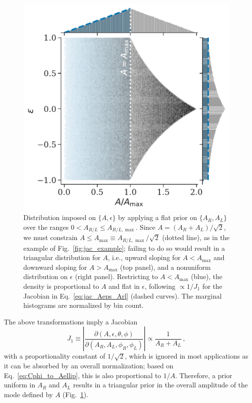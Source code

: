 \documentclass[aps,prd,twocolumn,superscriptaddress,preprintnumbers,floatfix,nofootinbib]{revtex4-2}
\newcommand*{\eq}[1]{Eq.~\eqref{eq:#1}}
\begin{document}
\begin{figure}
\includegraphics[width=0.8\columnwidth]{jac_Aeps_Arl}
\caption{Distribution imposed on $\{A,\epsilon\}$ by applying a flat prior on $\{A_R,A_L\}$ over the ranges $0 < A_{R/L} \leq A_{R/L,\max}$.
Since $A = (A_R + A_L)/\sqrt{2}$, we must constrain $A \leq A_{\max} \equiv A_{R/L,\max}/\sqrt{2}$ (dotted line), as in the example of Fig.~\ref{fig:jac_example};
failing to do so would result in a triangular distribution for $A$, i.e., upward sloping for $A < A_{\max}$ and downward sloping for $A > A_{\max}$ (top panel), and a nonuniform distribution on $\epsilon$ (right panel).
Restricting to $A < A_{\max}$ (blue), the density is proportional to $A$ and flat in $\epsilon$, following $\propto 1/J_1$ for the Jacobian in \eq{jac_Aeps_Arl} (dashed curves).
The marginal histograms are normalized by bin count.
}
\label{fig:jac_Aeps_Arl}
\end{figure}

The above transformations imply a Jacobian
\begin{equation} \label{eq:jac_Aeps_Arl}
J_1 \equiv \left| \frac{\partial(A,\epsilon,\theta,\phi)}{\partial(A_R, A_L, \phi_R, \phi_L)}\right| \propto \frac{1}{A_R + A_L}\, ,
\end{equation}
with a proportionality constant of $1/\sqrt{2}$, which is ignored in most applications as it can be absorbed by an overall normalization; based on \eq{Cphi_to_Aellip}, this is also proportional to $1/A$.
Therefore, a prior uniform in $A_R$ and $A_L$ results in a triangular prior in the overall amplitude of the mode defined by $A$ (Fig.~\ref{fig:jac_Aeps_Arl}).
\end{document}
